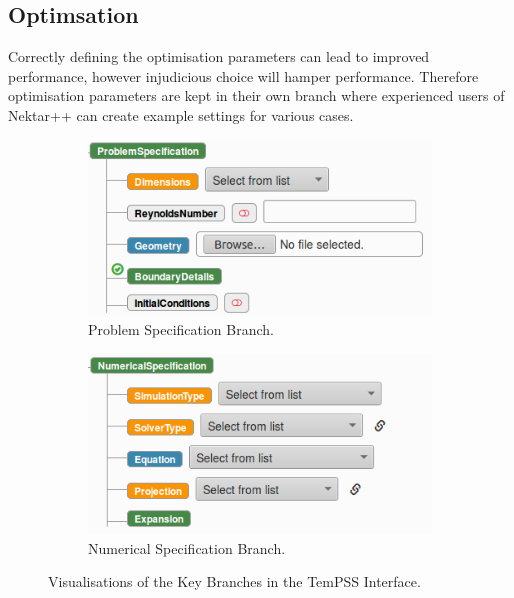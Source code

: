 \documentclass[11pt, a4paper]{report}
\begin{document}
\subsection{Optimsation}
Correctly defining the optimisation parameters can lead to improved performance, however injudicious choice will hamper performance. Therefore optimisation parameters are kept in their own branch where experienced users of Nektar++ can create example settings for various cases.

\begin{figure}[!htb]
\centering
\begin{subfigure}{.5\textwidth}
  \centering
  \includegraphics[width=1.\linewidth]{problem_spec}
  \caption{Problem Specification Branch.}
  \label{fig:problem_spec}
\end{subfigure}%
\begin{subfigure}{.5\textwidth}
  \centering
  \includegraphics[width=1.\linewidth]{numerical_spec}
  \caption{Numerical Specification Branch.}
  \label{fig:numerical_spec}
\end{subfigure}
\caption{Visualisations of the Key Branches in the TemPSS Interface.}
\label{fig:branches}
\end{figure}
\end{document}
